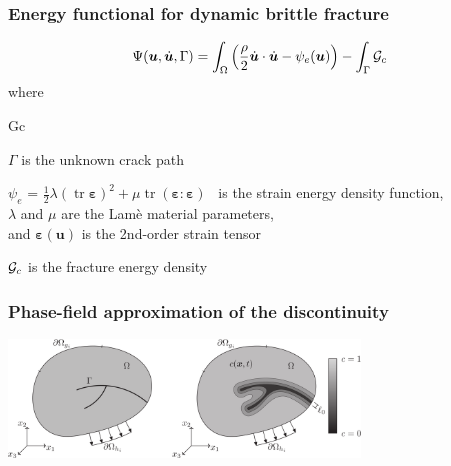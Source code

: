 \documentclass{beamer}
\DeclareMathOperator{\tr}{tr}
\begin{document}
\begin{frame}
  \frametitle{Energy functional for dynamic brittle fracture}

  \[
    \Psi(\bm{u},\dot{\bm{u}},\Gamma) = \int_\Omega\left(
      \frac{\rho}{2}\dot{\bm{u}}\cdot\dot{\bm{u}} - \psi_e(\bm{u}) \right) -
    \int_\Gamma {\cal G}_c
  \]
  where
  \begin{namelist}{Gc}
  \item[$\Gamma$] is the unknown crack path
  \item[$\psi_e$] = $\frac{1}{2}\lambda(\tr \bm \varepsilon)^2 +
    \mu\tr(\bm{\varepsilon}:\bm{\varepsilon})$
    ~is the strain energy density function, \\
    $\lambda$ and $\mu$ are the Lam\`e material parameters, \\ and
    $\bm{\varepsilon}(\bm{u})$ is the 2nd-order strain tensor
  \item[${\cal G}_c$] is the fracture energy density
  \end{namelist}
\end{frame}

\begin{frame}
  \frametitle{Phase-field approximation of the discontinuity}

  \begin{center}
    \includegraphics[trim=16cm 0cm 0cm 0cm, clip=true, width=0.7\textwidth]{figs/crack}
  \end{center}
\end{frame}
\end{document}
